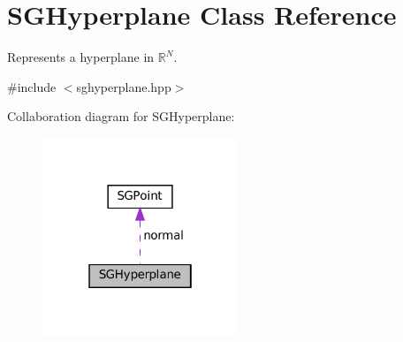 \hypertarget{classSGHyperplane}{}\section{S\+G\+Hyperplane Class Reference}
\label{classSGHyperplane}


Represents a hyperplane in $\mathbb{R}^N$.  




{\ttfamily \#include $<$sghyperplane.\+hpp$>$}



Collaboration diagram for S\+G\+Hyperplane\+:
\nopagebreak
\begin{figure}[H]
\begin{center}
\leavevmode
\includegraphics[width=166pt]{classSGHyperplane__coll__graph}
\end{center}
\end{figure}
